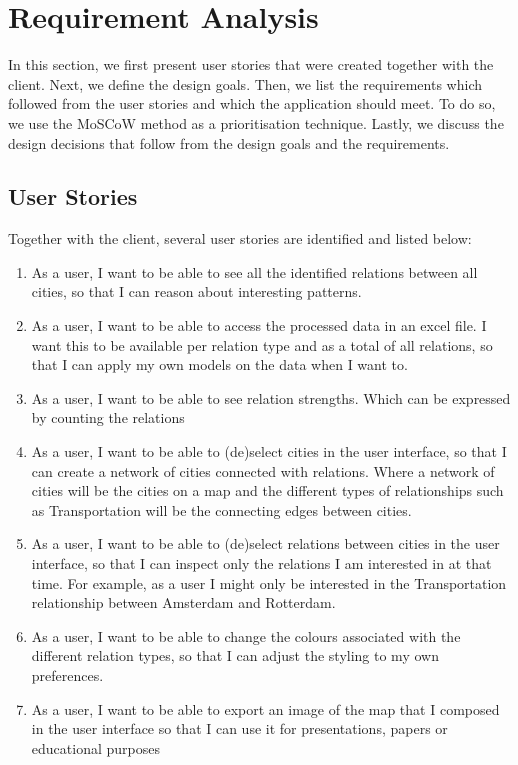 \section {Requirement Analysis}\label{sec:reqs-analysis}
In this section, we first present user stories that were created together with the client. Next, we define the design goals. Then, we list the requirements which followed from the user stories and which the application should meet. To do so, we use the MoSCoW method\cite{clegg1994case} as a prioritisation technique. Lastly, we discuss the design decisions that follow from the design goals and the requirements.

\subsection{User Stories}
Together with the client, several user stories are identified and listed below:
\begin{enumerate}
    \item As a user, I want to be able to see all the identified relations between all cities, so that I can reason about interesting patterns.
    \item As a user, I want to be able to access the processed data in an excel file. I want this to be available per relation type and as a total of all relations, so that I can apply my own models on the data when I want to.
    \item As a user, I want to be able to see relation strengths. Which can be expressed by counting the relations
    \item As a user, I want to be able to (de)select cities in the user interface, so that I can create a network of cities connected with relations. Where a network of cities will be the cities on a map and the different types of relationships such as Transportation will be the connecting edges between cities.
    \item As a user, I want to be able to (de)select relations between cities in the user interface, so that I can inspect only the relations I am interested in at that time. For example, as a user I might only be interested in the Transportation relationship between Amsterdam and Rotterdam.
    \item As a user, I want to be able to change the colours associated with the different relation types, so that I can adjust the styling to my own preferences.
    \item As a user, I want to be able to export an image of the map that I composed in the user interface so that I can use it for presentations, papers or educational purposes
\end{enumerate}

